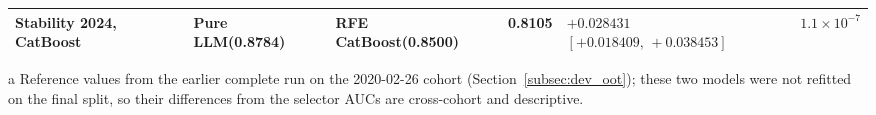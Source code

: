\documentclass[final,5p,twocolumn]{elsarticle}
\begin{document}
\begin{table}[htbp]
\begin{threeparttable}
\begin{tabular}{@{}L{21mm}L{25mm}L{22mm}rL{36mm}r@{}}
Stability 2024, CatBoost & Pure LLM\newline (0.8784) & RFE CatBoost\newline (0.8500) & 0.8105 & $+0.028431$\newline $[+0.018409,\,+0.038453]$ & $1.1\times10^{-7}$ \\
\bottomrule
\end{tabular}
\begin{tablenotes}\scriptsize
\item[a] Reference values from the earlier complete run on the 2020-02-26 cohort (Section~\ref{subsec:dev_oot}); these two models were not refitted on the final split, so their differences from the selector AUCs are cross-cohort and descriptive.
\end{tablenotes}
\end{threeparttable}
\end{table}
\end{document}
